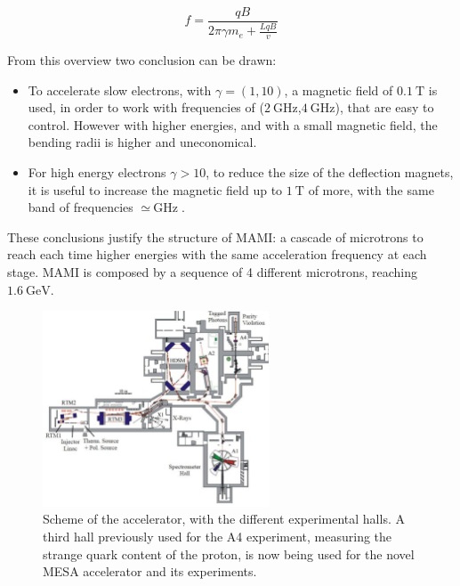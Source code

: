 \begin{equation} \label{eq:frequency}
f = \dfrac{qB}{2 \pi \gamma m_{e} + \frac{LqB}{v}} 
\end{equation}

From this overview two conclusion can be drawn:

\begin{itemize}
\item To accelerate slow electrons, with $\gamma = (1,10)$, a magnetic field of $\SI{0.1}{\tesla}$ is used, in order to work with frequencies of ($\SI{2}{\giga \hertz}$,$\SI{4}{\giga \hertz}$), that are easy to control. However with higher energies, and with a small magnetic field, the bending radii is higher and uneconomical.
\item For high energy electrons $\gamma > 10$, to reduce the size of the deflection magnets, it is useful to increase the magnetic field up to $\SI{1}{\tesla}$ of more, with the same band of frequencies $\simeq \SI{}{\giga \hertz}$.
\end{itemize}

These conclusions justify the structure of MAMI: a cascade of microtrons to reach each time higher energies with the same acceleration frequency at each stage.
MAMI is composed by a sequence of 4 different microtrons, reaching $\SI{1.6}{\giga \electronvolt}$. 

\begin{figure}[hbtp]
\centering
\includegraphics[width = 0.6\textwidth]{ExperimentalSetup/Accelerator.pdf}
\caption{Scheme of the accelerator, with the different experimental halls. A third hall previously used for the A4 experiment, measuring the strange quark content of the proton, is now being used for the novel MESA accelerator and its experiments.}
\label{fig:Accelerator}
\end{figure}

